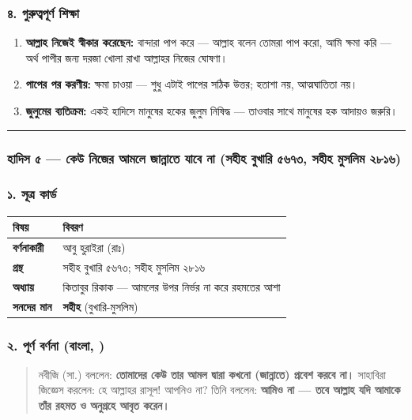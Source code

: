 \subsubsection*{৪. গুরুত্বপূর্ণ শিক্ষা}

\begin{enumerate}
\item \textbf{আল্লাহ নিজেই স্বীকার করেছেন:} বান্দারা পাপ করে — আল্লাহ বলেন তোমরা পাপ করো, আমি ক্ষমা করি — অর্থ পাপীর জন্য দরজা খোলা রাখা আল্লাহর নিজের ঘোষণা।
\item \textbf{পাপের পর করণীয়:} ক্ষমা চাওয়া — শুধু এটাই পাপের সঠিক উত্তর; হতাশা নয়, আত্মঘাতিতা নয়।
\item \textbf{জুলুমের ব্যতিক্রম:} একই হাদিসে মানুষের হকের জুলুম নিষিদ্ধ — তাওবার সাথে মানুষের হক আদায়ও জরুরি।
\end{enumerate}
\medskip\hrule\medskip

\subsubsection*{হাদিস ৫ — কেউ নিজের আমলে জান্নাতে যাবে না (সহীহ বুখারি ৫৬৭৩, সহীহ মুসলিম ২৮১৬)}

\subsubsection*{১. সূত্র কার্ড}

\begin{table}[h]\centering\small
\begin{tabular}{ll}
বিষয় & বিবরণ \\
\hline
\textbf{বর্ণনাকারী} & আবু হুরাইরা (রাঃ) \\
\textbf{গ্রন্থ} & সহীহ বুখারি ৫৬৭৩; সহীহ মুসলিম ২৮১৬ \\
\textbf{অধ্যায়} & কিতাবুর রিকাক — আমলের উপর নির্ভর না করে রহমতের আশা \\
\textbf{সনদের মান} & \textbf{সহীহ} (বুখারি-মুসলিম) \\
\hline
\end{tabular}
\end{table}

\subsubsection*{২. পূর্ণ বর্ণনা (বাংলা, )}

\begin{quote}
নবীজি (সা.) বললেন: \textbf{তোমাদের কেউ তার আমল দ্বারা কখনো (জান্নাতে) প্রবেশ করবে না।} সাহাবিরা জিজ্ঞেস করলেন: হে আল্লাহর রাসূল! আপনিও না? তিনি বললেন: \textbf{আমিও না — তবে আল্লাহ যদি আমাকে তাঁর রহমত ও অনুগ্রহে আবৃত করেন।}
\end{quote}

